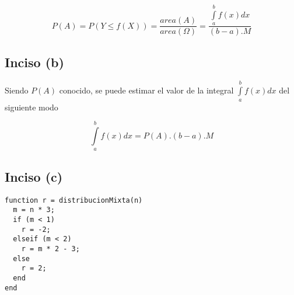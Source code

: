\documentclass[a4paper]{article}
\begin{document}
\[
  P(A) = P( Y \leqslant f(X) ) = \frac{ area(A) }{ area(\Omega) } =
  \frac{ \int\limits_a^b f(x) dx }{ (b-a) . M }
\]

\subsection{Inciso (b)}

Siendo $P(A)$ conocido, se puede estimar el valor de la integral
$\int\limits_a^b f(x) dx$ del siguiente modo

\[
  \int\limits_a^b f(x) dx = P(A).(b-a) . M
\]

\subsection{Inciso (c)}

\begin{lstlisting}[caption={distribucionMixta.m},label={lst:distribucionMixta}]
function r = distribucionMixta(n)
  m = n * 3;
  if (m < 1)
    r = -2;
  elseif (m < 2)
    r = m * 2 - 3;
  else
    r = 2;
  end
end
\end{lstlisting}
\end{document}
